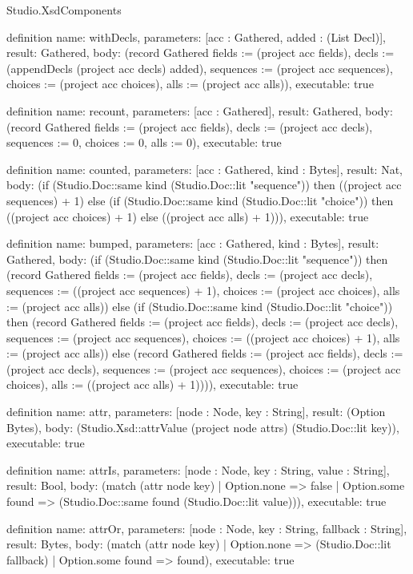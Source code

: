 \begin{lexlean}{Studio.XsdComponents}
\begin{semanticmodule}
definition{
  name: withDecls,
  parameters: [acc : Gathered, added : (List Decl)],
  result: Gathered,
  body: (record Gathered {fields := (project acc fields), decls := (appendDecls (project acc decls) added), sequences := (project acc sequences), choices := (project acc choices), alls := (project acc alls)}),
  executable: true
}

definition{
  name: recount,
  parameters: [acc : Gathered],
  result: Gathered,
  body: (record Gathered {fields := (project acc fields), decls := (project acc decls), sequences := 0, choices := 0, alls := 0}),
  executable: true
}

definition{
  name: counted,
  parameters: [acc : Gathered, kind : Bytes],
  result: Nat,
  body: (if (Studio.Doc::same kind (Studio.Doc::lit "sequence")) then ((project acc sequences) + 1) else (if (Studio.Doc::same kind (Studio.Doc::lit "choice")) then ((project acc choices) + 1) else ((project acc alls) + 1))),
  executable: true
}

definition{
  name: bumped,
  parameters: [acc : Gathered, kind : Bytes],
  result: Gathered,
  body: (if (Studio.Doc::same kind (Studio.Doc::lit "sequence")) then (record Gathered {fields := (project acc fields), decls := (project acc decls), sequences := ((project acc sequences) + 1), choices := (project acc choices), alls := (project acc alls)}) else (if (Studio.Doc::same kind (Studio.Doc::lit "choice")) then (record Gathered {fields := (project acc fields), decls := (project acc decls), sequences := (project acc sequences), choices := ((project acc choices) + 1), alls := (project acc alls)}) else (record Gathered {fields := (project acc fields), decls := (project acc decls), sequences := (project acc sequences), choices := (project acc choices), alls := ((project acc alls) + 1)}))),
  executable: true
}

definition{
  name: attr,
  parameters: [node : Node, key : String],
  result: (Option Bytes),
  body: (Studio.Xsd::attrValue (project node attrs) (Studio.Doc::lit key)),
  executable: true
}

definition{
  name: attrIs,
  parameters: [node : Node, key : String, value : String],
  result: Bool,
  body: (match (attr node key)
    | Option.none => false
    | Option.some found => (Studio.Doc::same found (Studio.Doc::lit value))),
  executable: true
}

definition{
  name: attrOr,
  parameters: [node : Node, key : String, fallback : String],
  result: Bytes,
  body: (match (attr node key)
    | Option.none => (Studio.Doc::lit fallback)
    | Option.some found => found),
  executable: true
}


\end{semanticmodule}
\end{lexlean}
